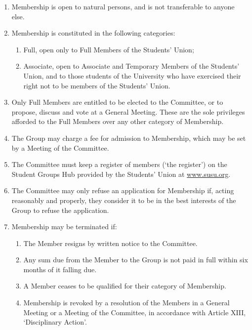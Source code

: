 \documentclass[12pt]{constitution}
\begin{document}
\begin{enumerate}
    \item Membership is open to natural persons, and is not transferable to anyone else.
    \item Membership is constituted in the following categories:
    \begin{enumerate}
        \item Full, open only to Full Members of the Students' Union;
        \item Associate, open to Associate and Temporary Members of the Students' Union, and to those students of the University who have exercised their right not to be members of the Students' Union.
    \end{enumerate}
    \item Only Full Members are entitled to be elected to the Committee, or to propose, discuss and vote at a General Meeting. These are the sole privileges afforded to the Full Members over any other category of Membership.
    \item The Group may charge a fee for admission to Membership, which may be set by a Meeting of the Committee.
    \item The Committee must keep a register of members (`the register') on the Student Groups Hub provided by the Students' Union at \url{www.susu.org}.
    \item The Committee may only refuse an application for Membership if, acting reasonably and properly, they consider it to be in the best interests of the Group to refuse the application.
    \item Membership may be terminated if:
    \begin{enumerate}
        \item The Member resigns by written notice to the Committee.
        \item Any sum due from the Member to the Group is not paid in full within six months of it falling due.
        \item A Member ceases to be qualified for their category of Membership.
        \item Membership is revoked by a resolution of the Members in a General Meeting or a Meeting of the Committee, in accordance with Article XIII, `Disciplinary Action'.
    \end{enumerate}
\end{enumerate}

\end{document}
